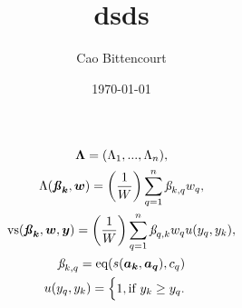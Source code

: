 \documentclass{article}
\title{
    dsds
}
\author{Cao Bittencourt}
\date{\today}
\begin{document}
\maketitle

\begin{gather}
    \boldsymbol{\Lambda} = (\Lambda_{1}, ..., \Lambda_{n}),\\
    \Lambda(\boldsymbol{\textbf{\textit{\ss}}_{k}}, \boldsymbol{w}) = 
        \left(
            \frac{1}{W}
        \right)
        \sum_{q=1}^{n}{
            \textit{\ss}_{k,q}
            w_q
        },\\
    \text{vs}(\boldsymbol{\textbf{\textit{\ss}}_{k}}, \boldsymbol{w}, \boldsymbol{y}) = 
    \left(
        \frac{1}{W}
    \right)
        \sum_{q=1}^{n}{
            \textit{\ss}_{q,k}
            w_q
            u(y_q,y_k)
        }
        ,\\
    \textit{\ss}_{k,q} = 
        \text{eq}(s(\boldsymbol{a_k},\boldsymbol{a_q}), c_q)\\
    u(y_q,y_k) =
    \begin{cases}
        1, \text{if } y_k \geq y_q.\\

\end{cases}
\end{gather}
\end{document}
